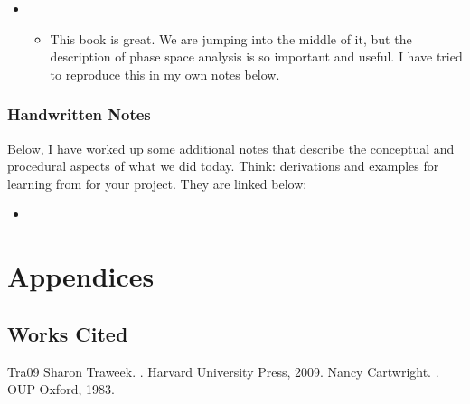 \documentclass[letterpaper,10pt,english]{jupyterBook}
\begin{document}
\begin{itemize}
\begin{itemize}
\end{itemize}

\item {} 
\sphinxAtStartPar
{}
\begin{itemize}
\item {} 
\sphinxAtStartPar
This book is great. We are jumping into the middle of it, but the description of phase space analysis is so important and useful. I have tried to reproduce this in my own notes below.

\end{itemize}

\end{itemize}


\section{Handwritten Notes}
\label{\detokenize{content/1_mechanics/sho/notes-SHO:handwritten-notes}}
\sphinxAtStartPar
Below, I have worked up some additional notes that describe the conceptual and procedural aspects of what we did today. Think: derivations and examples for learning from for your project. They are linked below:
\begin{itemize}
\item {} 
\sphinxAtStartPar
{}

\end{itemize}

\sphinxstepscope


\part{Appendices}

\sphinxstepscope


\chapter{Works Cited}
\label{\detokenize{content/references:works-cited}}\label{\detokenize{content/references::doc}}
\begin{sphinxthebibliography}{Tra09}
\sphinxAtStartPar
Sharon Traweek. . Harvard University Press, 2009.
\sphinxAtStartPar
Nancy Cartwright. . OUP Oxford, 1983.
\end{sphinxthebibliography}







\renewcommand{\indexname}{Index}
\printindex
\end{document}
